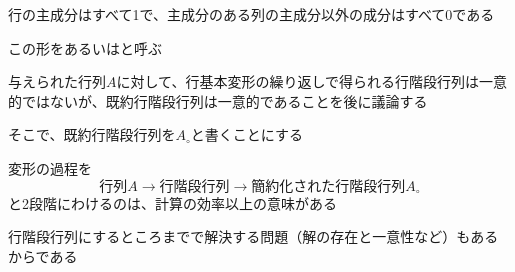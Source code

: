 \documentclass[../../../topic_linear-algebra]{subfiles}
\begin{document}
行の主成分はすべて1で、主成分のある列の主成分以外の成分はすべて0である

この形をあるいはと呼ぶ

\br

与えられた行列$A$に対して、行基本変形の繰り返しで得られる行階段行列は一意的ではないが、既約行階段行列は一意的であることを後に議論する

そこで、既約行階段行列を$A_\circ$と書くことにする

\sectionline

変形の過程を
\begin{equation*}
  \text{行列}A \rightarrow \text{行階段行列} \rightarrow \text{簡約化された行階段行列}A_\circ
\end{equation*}
と2段階にわけるのは、計算の効率以上の意味がある

行階段行列にするところまでで解決する問題（解の存在と一意性など）もあるからである
\end{document}
